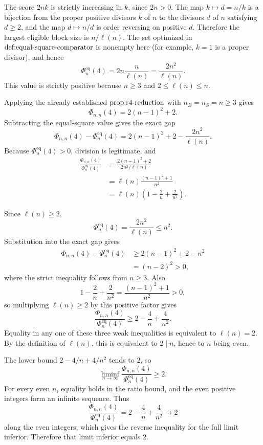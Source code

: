 The score \(2nk\) is strictly increasing in \(k\), since \(2n>0\). The map \(k\mapsto d=n/k\) is a bijection from the proper positive divisors \(k\) of \(n\) to the divisors \(d\) of \(n\) satisfying \(d\ge2\), and the map \(d\mapsto n/d\) is order reversing on positive \(d\). Therefore the largest eligible block size is \(n/\ell(n)\). The set optimized in \(\textnormal{def:equal-square-comparator}\) is nonempty here (for example, \(k=1\) is a proper divisor), and hence
\[
\Phi_n^{\mathrm{eq}}(4)
=2n\frac{n}{\ell(n)}
=\frac{2n^2}{\ell(n)}.
\]
This value is strictly positive because \(n\ge3\) and \(2\le\ell(n)\le n\).

Applying the already established \(\textnormal{prop:r4-reduction}\) with \(n_B=n_S=n\ge3\) gives
\[
\Phi_{n,n}(4)=2(n-1)^2+2.
\]
Subtracting the equal-square value gives the exact gap
\[
\Phi_{n,n}(4)-\Phi_n^{\mathrm{eq}}(4)
=2(n-1)^2+2-\frac{2n^2}{\ell(n)}.
\]
Because \(\Phi_n^{\mathrm{eq}}(4)>0\), division is legitimate, and
\[
\begin{aligned}
\frac{\Phi_{n,n}(4)}{\Phi_n^{\mathrm{eq}}(4)}
&=\frac{2(n-1)^2+2}{2n^2/\ell(n)}\\
&=\ell(n)\frac{(n-1)^2+1}{n^2}\\
&=\ell(n)\left(1-\frac2n+\frac{2}{n^2}\right).
\end{aligned}
\]

Since \(\ell(n)\ge2\),
\[
\Phi_n^{\mathrm{eq}}(4)=\frac{2n^2}{\ell(n)}\le n^2.
\]
Substitution into the exact gap gives
\[
\begin{aligned}
\Phi_{n,n}(4)-\Phi_n^{\mathrm{eq}}(4)
&\ge2(n-1)^2+2-n^2\\
&=(n-2)^2>0,
\end{aligned}
\]
where the strict inequality follows from \(n\ge3\). Also
\[
1-\frac2n+\frac{2}{n^2}
=\frac{(n-1)^2+1}{n^2}>0,
\]
so multiplying \(\ell(n)\ge2\) by this positive factor gives
\[
\frac{\Phi_{n,n}(4)}{\Phi_n^{\mathrm{eq}}(4)}
\ge2-\frac4n+\frac4{n^2}.
\]
Equality in any one of these three weak inequalities is equivalent to \(\ell(n)=2\). By the definition of \(\ell(n)\), this is equivalent to \(2\mid n\), hence to \(n\) being even.

The lower bound \(2-4/n+4/n^2\) tends to \(2\), so
\[
\liminf_{n\to\infty}
\frac{\Phi_{n,n}(4)}{\Phi_n^{\mathrm{eq}}(4)}\ge2.
\]
For every even \(n\), equality holds in the ratio bound, and the even positive integers form an infinite sequence. Thus
\[
\frac{\Phi_{n,n}(4)}{\Phi_n^{\mathrm{eq}}(4)}
=2-\frac4n+\frac4{n^2}\longrightarrow2
\]
along the even integers, which gives the reverse inequality for the full limit inferior. Therefore that limit inferior equals \(2\).

